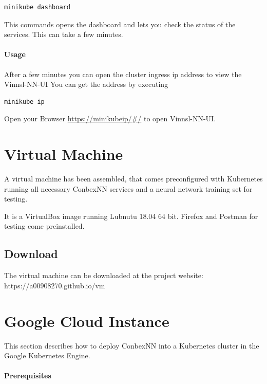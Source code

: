 \begin{verbatim}
minikube dashboard
\end{verbatim}

This commands opens the dashboard and lets you check the status of the
services. This can take a few minutes.

\paragraph{Usage}\label{usage}

After a few minutes you can open the cluster ingress ip address to view
the Vinnsl-NN-UI You can get the address by executing

\begin{verbatim}
minikube ip
\end{verbatim}

Open your Browser \url{https://minikubeip/\#/} to open Vinnsl-NN-UI.

\section{Virtual Machine}\label{virtual-machine}

A virtual machine has been assembled, that comes preconfigured with
Kubernetes running all necessary ConbexNN services and a neural network
training set for testing.

It is a VirtualBox image running Lubnutu 18.04 64 bit. Firefox and
Postman for testing come preinstalled.

\subsection{Download}\label{download}

The virtual machine can be downloaded at the project website:
https://a00908270.github.io/vm

\section{Google Cloud Instance}\label{google-cloud-instance}

This section describes how to deploy ConbexNN into a Kubernetes cluster
in the Google Kubernetes Engine.

\paragraph{Prerequisites}\label{prerequisites-1}


